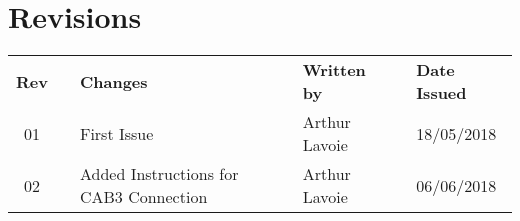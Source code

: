 \newpage
\section{Revisions}

\begin{table}[H]
    \centering
    \begin{tabular}{cllllll}\toprule
         \textbf{Rev} & \phantom{a} &\textbf{Changes} & \phantom{a} & \textbf{Written by} & \phantom{a} & \textbf{Date Issued} \\
        \cmidrule{3-7}
        01 & & First Issue & & Arthur Lavoie & & 18/05/2018 \\
        02 & & Added Instructions for CAB3 Connection & & Arthur Lavoie & & 06/06/2018 \\
        \bottomrule
    \end{tabular}
\end{table}